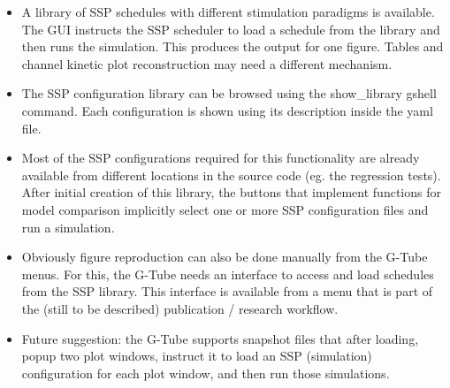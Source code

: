 \documentclass[12pt]{article}
\begin{document}
\begin{itemize}
\item A library of SSP schedules with different stimulation paradigms
  is available.  The GUI instructs the SSP scheduler to load a
  schedule from the library and then runs the simulation.  This
  produces the output for one figure.  Tables and channel kinetic plot
  reconstruction may need a different mechanism.
\item The SSP configuration library can be browsed using the
  show\_library gshell command.  Each configuration is shown using its
  description inside the yaml file.
\item Most of the SSP configurations required for this functionality
  are already available from different locations in the source code
  (eg. the regression tests).  After initial creation of this library,
  the buttons that implement functions for model comparison implicitly
  select one or more SSP configuration files and run a simulation.
\item Obviously figure reproduction can also be done manually from the
  G-Tube menus.  For this, the G-Tube needs an interface to access and
  load schedules from the SSP library.  This interface is available
  from a menu that is part of the (still to be described) publication
  / research workflow.
\item Future suggestion: the G-Tube supports snapshot files that after
  loading, popup two plot windows, instruct it to load an SSP
  (simulation) configuration for each plot window, and then run those
  simulations.
\end{itemize}




\end{document}
